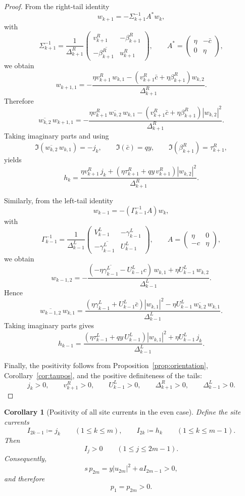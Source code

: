\documentclass[11pt]{article}
\newtheorem{corollary}[theorem]{Corollary}
\begin{document}
\begin{proof}
From the right-tail identity
\[
w_{k+1}=-\Sigma_{k+1}^{-1}A^*w_k,
\]
with
\[
\Sigma_{k+1}^{-1}
=
\frac1{\Delta_{k+1}^R}
\begin{pmatrix}
v_{k+1}^R & -\beta_{k+1}^R\\
-\overline{\beta_{k+1}^R} & u_{k+1}^R
\end{pmatrix},
\qquad
A^*=
\begin{pmatrix}
\eta & -\bar c\\
0 & \eta
\end{pmatrix},
\]
we obtain
\[
w_{k+1,1}
=
-\frac{
\eta v_{k+1}^R\,w_{k,1}
-(v_{k+1}^R\bar c+\eta\beta_{k+1}^R)w_{k,2}
}{
\Delta_{k+1}^R
}.
\]
Therefore
\[
\overline{w_{k,2}}\,w_{k+1,1}
=
-\frac{
\eta v_{k+1}^R\,\overline{w_{k,2}}\,w_{k,1}
-(v_{k+1}^R\bar c+\eta\beta_{k+1}^R)|w_{k,2}|^2
}{
\Delta_{k+1}^R
}.
\]
Taking imaginary parts and using
\[
\Im(\overline{w_{k,2}}\,w_{k,1})=-j_k,
\qquad
\Im(\bar c)=qy,
\qquad
\Im(\beta_{k+1}^R)=\tau_{k+1}^R,
\]
yields
\[
h_k
=
\frac{
\eta v_{k+1}^R\,j_k
+
(\eta\tau_{k+1}^R+qy\,v_{k+1}^R)|w_{k,2}|^2
}{
\Delta_{k+1}^R
}.
\]

Similarly, from the left-tail identity
\[
w_{k-1}=-(\Gamma_{k-1}^{-1}A)w_k,
\]
with
\[
\Gamma_{k-1}^{-1}
=
\frac1{\Delta_{k-1}^L}
\begin{pmatrix}
V_{k-1}^L & -\gamma_{k-1}^L\\
-\overline{\gamma_{k-1}^L} & U_{k-1}^L
\end{pmatrix},
\qquad
A=
\begin{pmatrix}
\eta & 0\\
-c & \eta
\end{pmatrix},
\]
we obtain
\[
w_{k-1,2}
=
-\frac{
(-\eta\overline{\gamma_{k-1}^L}-U_{k-1}^L c)\,w_{k,1}
+\eta U_{k-1}^L\,w_{k,2}
}{
\Delta_{k-1}^L
}.
\]
Hence
\[
\overline{w_{k-1,2}}\,w_{k,1}
=
\frac{
(\eta\gamma_{k-1}^L+U_{k-1}^L\bar c)|w_{k,1}|^2
-\eta U_{k-1}^L\,\overline{w_{k,2}}\,w_{k,1}
}{
\Delta_{k-1}^L
}.
\]
Taking imaginary parts gives
\[
h_{k-1}
=
\frac{
(\eta\tau_{k-1}^L+qy\,U_{k-1}^L)|w_{k,1}|^2
+\eta U_{k-1}^L\,j_k
}{
\Delta_{k-1}^L
}.
\]

Finally, the positivity follows from Proposition~\ref{prop:orientation},
Corollary~\ref{cor:taupos}, and the positive definiteness of the tails:
\[
j_k>0,\qquad
v_{k+1}^R>0,\qquad
U_{k-1}^L>0,\qquad
\Delta_{k+1}^R>0,\qquad
\Delta_{k-1}^L>0.
\]
\end{proof}

\begin{corollary}[Positivity of all site currents in the even case]\label{cor:sitecurr}
Define the site currents
\[
I_{2k-1}\coloneqq j_k
\qquad (1\le k\le m),
\qquad
I_{2k}\coloneqq h_k
\qquad (1\le k\le m-1).
\]
Then
\[
I_j>0
\qquad
(1\le j\le 2m-1).
\]
Consequently,
\[
s\,p_{2m}=y|u_{2m}|^2+aI_{2m-1}>0,
\]
and therefore
\[
p_1=p_{2m}>0.
\]
\end{corollary}
\end{document}
